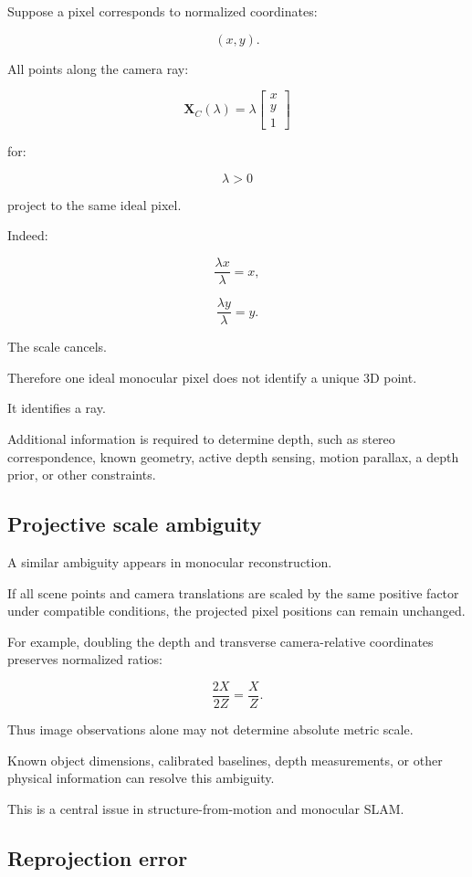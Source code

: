 Suppose a pixel corresponds to normalized coordinates:

\[
 (x,y).
\]

All points along the camera ray:

\[
 \boxed{ \mathbf X_C(\lambda)= \lambda \begin{bmatrix} x\\y\\1 \end{bmatrix} }
\]

for:

\[
 \lambda>0
\]

project to the same ideal pixel.

Indeed:

\[
 \frac{\lambda x}{\lambda}=x,
\]

\[
 \frac{\lambda y}{\lambda}=y.
\]

The scale cancels.

Therefore one ideal monocular pixel does not identify a unique 3D point.

It identifies a ray.

Additional information is required to determine depth, such as stereo correspondence, known geometry, active depth sensing, motion parallax, a depth prior, or other constraints.

\subsection{Projective scale ambiguity}\label{02-foundations-ii-ch035-projective-scale-ambiguity}

A similar ambiguity appears in monocular reconstruction.

If all scene points and camera translations are scaled by the same positive factor under compatible conditions, the projected pixel positions can remain unchanged.

For example, doubling the depth and transverse camera-relative coordinates preserves normalized ratios:

\[
 \frac{2X}{2Z}=\frac XZ.
\]

Thus image observations alone may not determine absolute metric scale.

Known object dimensions, calibrated baselines, depth measurements, or other physical information can resolve this ambiguity.

This is a central issue in structure-from-motion and monocular SLAM.

\subsection{Reprojection error}\label{02-foundations-ii-ch035-reprojection-error}

